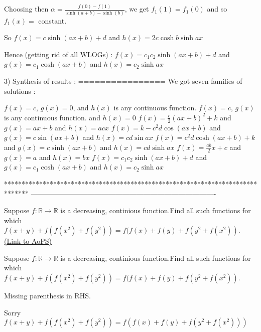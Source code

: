 \begin{solution}
Choosing then $\alpha=\frac{f(0)-f(1)}{\sinh (a+b)-\sinh(b)}$, we get $f_1(1)=f_1(0)$ and so $f_1(x)=$ constant.

So $f(x)=c\sinh(ax+b)+d$ and $h(x)=2c\cosh b\sinh ax$

Hence (getting rid of all WLOGs) :
$f(x)=c_1c_2\sinh(ax+b)+d$ and $g(x)=c_1\cosh(ax+b)$ and $h(x)=c_2\sinh ax$

3) Synthesis of results :
================
We got seven families of solutions :

$f(x)=c$, $g(x)=0$, and $h(x)$ is any continuous function.
$f(x)=c$, $g(x)$ is any continuous function. and $h(x)=0$
$f(x)=\frac{c}2(ax+b)^2+k$ and $g(x)=ax+b$ and $h(x)=acx$
$f(x)=k-c^2d\cos(ax+b)$ and $g(x)=c\sin(ax+b)$ and $h(x)=cd\sin ax$
$f(x)=c^2d\cosh(ax+b)+k$ and $g(x)=c\sinh(ax+b)$ and $h(x)=cd\sinh ax$
$f(x)=\frac {ab}2x+c$ and $g(x)=a$ and $h(x)=bx$
$f(x)=c_1c_2\sinh(ax+b)+d$ and $g(x)=c_1\cosh(ax+b)$ and $h(x)=c_2\sinh ax$
\end{solution}
*******************************************************************************
-------------------------------------------------------------------------------

\begin{problem}
	Suppose $f: \mathbb{R}\to\mathbb{R}$ is a decreasing, continious function.Find all such functions for which $f(x+y)+f(f(x^2)+f(y^2))=f(f(x)+f(y)+f(y^2+f(x^2))$.
	\flushright \href{https://artofproblemsolving.com/community/c6h568502}{(Link to AoPS)}
\end{problem}



\begin{solution}
	\begin{tcolorbox}Suppose $f: \mathbb{R}\to\mathbb{R}$ is a decreasing, continious function.Find all such functions for which $f(x+y)+f(f(x^2)+f(y^2))=f(f(x)+f(y)+f(y^2+f(x^2))$.\end{tcolorbox}
Missing parenthesis in RHS.
\end{solution}



\begin{solution}
	Sorry  $f(x+y)+f(f(x^2)+f(y^2))=f(f(x)+f(y)+f(y^2+f(x^2)))$
\end{solution}



